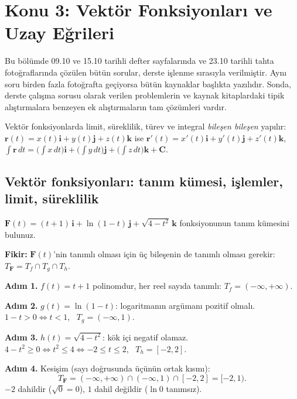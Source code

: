 \section{Konu 3: Vektör Fonksiyonları ve Uzay Eğrileri}

Bu bölümde 09.10 ve 15.10 tarihli defter sayfalarında ve 23.10 tarihli tahta fotoğraflarında çözülen bütün sorular, derste
işlenme sırasıyla verilmiştir. Aynı soru birden fazla fotoğrafta geçiyorsa bütün kaynaklar başlıkta yazılıdır. Sonda, derste
çalışma sorusu olarak verilen problemlerin ve kaynak kitaplardaki tipik alıştırmalara benzeyen ek alıştırmaların tam çözümleri vardır.

\begin{bilgi}[Hatırlatma]
Vektör fonksiyonlarda limit, süreklilik, türev ve integral \emph{bileşen bileşen} yapılır:
$\mathbf r(t)=x(t)\mathbf i+y(t)\mathbf j+z(t)\mathbf k$ ise $\mathbf r'(t)=x'(t)\mathbf i+y'(t)\mathbf j+z'(t)\mathbf k$,
$\int\mathbf r\,dt=\big(\int x\,dt\big)\mathbf i+\big(\int y\,dt\big)\mathbf j+\big(\int z\,dt\big)\mathbf k+\mathbf C$.
\end{bilgi}

\subsection{Vektör fonksiyonları: tanım kümesi, işlemler, limit, süreklilik}

\begin{soru}
$\mathbf F(t)=(t+1)\,\mathbf i+\ln(1-t)\,\mathbf j+\sqrt{4-t^2}\,\mathbf k$ fonksiyonunun tanım kümesini bulunuz.
\end{soru}
\begin{cevap}
\textbf{Fikir:} $\mathbf F(t)$'nin tanımlı olması için üç bileşenin de tanımlı olması gerekir: $T_{\mathbf F}=T_f\cap T_g\cap T_h$.

\textbf{Adım 1.} $f(t)=t+1$ polinomdur, her reel sayıda tanımlı: $T_f=(-\infty,+\infty)$.

\textbf{Adım 2.} $g(t)=\ln(1-t)$: logaritmanın argümanı pozitif olmalı. $1-t>0\iff t<1$, \ $T_g=(-\infty,1)$.

\textbf{Adım 3.} $h(t)=\sqrt{4-t^2}$: kök içi negatif olamaz. $4-t^2\ge0\iff t^2\le4\iff-2\le t\le2$, \ $T_h=[-2,2]$.

\textbf{Adım 4.} Kesişim (sayı doğrusunda üçünün ortak kısmı):
\[ T_{\mathbf F}=(-\infty,+\infty)\cap(-\infty,1)\cap[-2,2]=\boxed{[-2,1)} . \]
$-2$ dahildir ($\sqrt0=0$), $1$ dahil değildir ($\ln0$ tanımsız).
\end{cevap}

